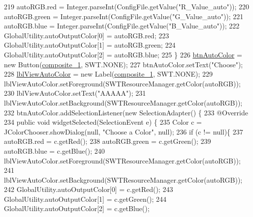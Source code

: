 \begin{DoxyCode}
219             autoRGB.red = Integer.parseInt(ConfigFile.getValue(\textcolor{stringliteral}{"R\_Value\_auto"}));
220             autoRGB.green = Integer.parseInt(ConfigFile.getValue(\textcolor{stringliteral}{"G\_Value\_auto"}));
221             autoRGB.blue = Integer.parseInt(ConfigFile.getValue(\textcolor{stringliteral}{"B\_Value\_auto"}));       
222             GlobalUtility.autoOutputColor[0] = autoRGB.red;
223             GlobalUtility.autoOutputColor[1] = autoRGB.green;
224             GlobalUtility.autoOutputColor[2] = autoRGB.blue;
225         \}
226         \hyperlink{classit_1_1isislab_1_1masonassisteddocumentation_1_1mason_1_1wizards_1_1_b___project_information_page_a1c3cf5ff2d1b0d408f03db81e8e40c6a}{btnAutoColor} = \textcolor{keyword}{new} Button(\hyperlink{classit_1_1isislab_1_1masonassisteddocumentation_1_1mason_1_1wizards_1_1_b___project_information_page_a89067957695a1743c11b64ff76f1e5c9}{composite\_1}, SWT.NONE);
227         btnAutoColor.setText(\textcolor{stringliteral}{"Choose"});
228         \hyperlink{classit_1_1isislab_1_1masonassisteddocumentation_1_1mason_1_1wizards_1_1_b___project_information_page_ae3ce9b9ca6502f09db614860f5a1a127}{lblViewAutoColor} = \textcolor{keyword}{new} Label(\hyperlink{classit_1_1isislab_1_1masonassisteddocumentation_1_1mason_1_1wizards_1_1_b___project_information_page_a89067957695a1743c11b64ff76f1e5c9}{composite\_1}, SWT.NONE);
229         lblViewAutoColor.setForeground(SWTResourceManager.getColor(autoRGB));
230         lblViewAutoColor.setText(\textcolor{stringliteral}{"AAAAA"});
231         lblViewAutoColor.setBackground(SWTResourceManager.getColor(autoRGB));
232         btnAutoColor.addSelectionListener(\textcolor{keyword}{new} SelectionAdapter() \{
233             @Override
234             \textcolor{keyword}{public} \textcolor{keywordtype}{void} widgetSelected(SelectionEvent e) \{
235                 Color c = JColorChooser.showDialog(null, \textcolor{stringliteral}{"Choose a Color"}, null);
236                   \textcolor{keywordflow}{if} (c != null)\{
237                       autoRGB.red = c.getRed();
238                       autoRGB.green = c.getGreen();
239                       autoRGB.blue = c.getBlue();
240                       lblViewAutoColor.setForeground(SWTResourceManager.getColor(autoRGB));
241                       lblViewAutoColor.setBackground(SWTResourceManager.getColor(autoRGB));
242                       GlobalUtility.autoOutputColor[0] = c.getRed();
243                       GlobalUtility.autoOutputColor[1] = c.getGreen();
244                       GlobalUtility.autoOutputColor[2] = c.getBlue();

\end{DoxyCode}

